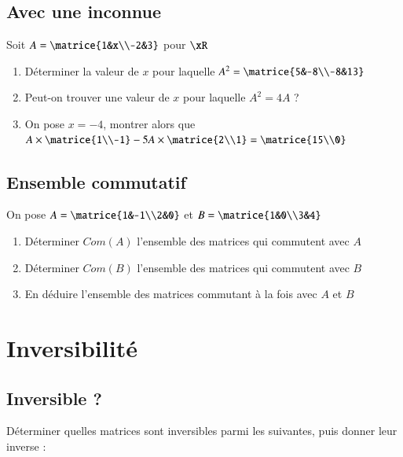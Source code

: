 \documentclass[oneside,12pt]{article}          %
\begin{document}
\subsection{Avec une inconnue}
Soit $A=\matrice{1&x\\-2&3} $ pour $\xR$
\begin{enumerate}
    \item Déterminer la valeur de $x$ pour laquelle $A^2=\matrice{5&-8\\-8&13}$
    \item Peut-on trouver une valeur de $x$ pour laquelle $A^2=4A$ ?
    \item On pose $x=-4$, montrer alors que $A\times\matrice{1\\-1}-5A\times\matrice{2\\1}=\matrice{15\\0}  $
\end{enumerate}



\subsection{Ensemble commutatif}
On pose $A=\matrice{1&-1\\2&0}$ et $B=\matrice{1&0\\3&4}$
\begin{enumerate}
    \item Déterminer $Com(A)$ l'ensemble des matrices qui commutent avec $A$
    \item Déterminer $Com(B)$ l'ensemble des matrices qui commutent avec $B$
    \item En déduire l'ensemble des matrices commutant à la fois avec $A$ et $B$
\end{enumerate}



\section{Inversibilité}

\subsection{Inversible ?}
Déterminer quelles matrices sont inversibles parmi les suivantes, puis donner leur inverse :
\end{document}
